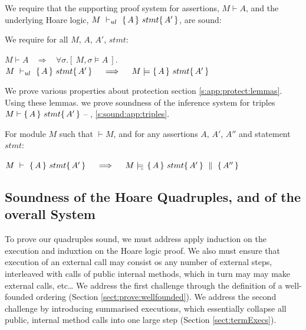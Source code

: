 We require  that the supporting proof system for assertions, $M\vdash A$, and the  underlying Hoare logic, $M\ \vdash_{ul}\  \triple A {stmt} {A'}$, are sound:
\begin{axiom}
\label{lemma:axiom:enc:assert:ul}
\label{ax:ul:sound}
We require for all $M$, $A$, $A'$, $stmt$:
\begin{center}
$M \vdash A   \ \ \ \  \Longrightarrow  \ \ \ \  \forall \sigma.[\ M, \sigma \models A\ ]$.\\
%
%
{$M\ \vdash_{ul}\   \{\, A \, \}\ stmt \{\, A' \, \}  \ \ \ \  \Longrightarrow  \ \ \ \ M \models   \{\, A \, \}\ stmt \{\, A' \, \}$ }
 \end{center}
\end{axiom}

\noindent
\label{sect:prove:triples:sound}
We prove various properties about protection
\cf section \ref{s:app:protect:lemmas}.
Using these lemmas. we prove soundness of the inference system for triples $M \vdash   \{\, A \, \}\ stmt \{\, A' \, \} $ -- \cf \A, \ref{s:sound:app:triples}.

 
 


\begin{Theorem}
\label{l:triples:sound}
For module  $M$ %
such that  $\vdash M$, and for any assertions $A$,  $A'$, $A''$ and statement  $stmt$:
\begin{center}
$M\ \vdash\  \triple A {stmt} {A'}  \ \ \ \  \Longrightarrow  \ \ \ \ \satisfiesD {M} {\quadruple {A} {stmt} {A'} {A''}}$
\end{center}
\end{Theorem}
 



\subsection{Soundness of the Hoare Quadruples, and of the overall System}

To prove our quadruples sound, we must address 
apply induction on the execution and induxtion on the Hoare logic
proof.  We also must ensure that
execution of an external call may consist os any number of external
steps, interleaved with calls of public internal methods, which in
turn may may make external calls, etc\ldots%
%
We address the first challenge  through the definition of a well-founded ordering (\cf Section \ref{sect:prove:wellfounded}). 
We address the second challenge by introducing summarised executions, which essentially collapse all public, internal method calls into one large step (\cf Section \ref{sect:termExecs}).

